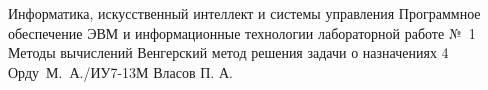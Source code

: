 \documentclass{bmstu}
\begin{document}
\makereporttitle
    {Информатика, искусственный интеллект и системы управления} %
    {Программное обеспечение ЭВМ и информационные технологии} %
    {лабораторной работе №~1} %
    {Методы вычислений} %
    {Венгерский метод решения задачи о назначениях} %
    {4} %
    {Орду~М.~А./ИУ7-13М} %
    {Власов П. А.} %







% 
\end{document}
